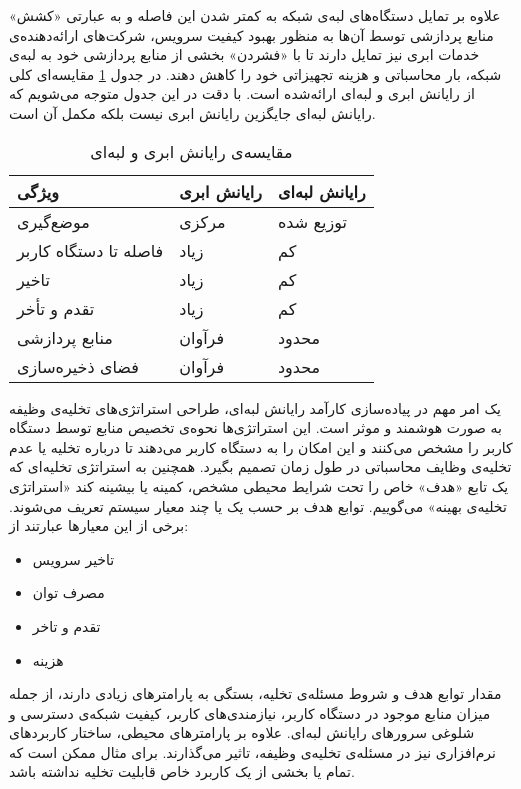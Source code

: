 علاوه بر تمایل دستگاه‌های لبه‌ی شبکه به کمتر شدن این فاصله و به عبارتی «کشش» منابع پردازشی توسط آن‌ها به منظور بهبود کیفیت سرویس، شرکت‌های ارائه‌دهنده‌ی خدمات ابری نیز تمایل دارند تا با «فشردن» بخشی از منابع پردازشی خود به لبه‌ی شبکه، بار محاسباتی و هزینه تجهیزاتی خود را کاهش دهند.\cite{edgevisions} در جدول \ref{table:compare} مقایسه‌ای کلی از رایانش ابری و لبه‌ای ارائه‌شده است. با دقت در این جدول متوجه می‌شویم که رایانش لبه‌ای جایگزین رایانش ابری نیست بلکه مکمل آن است.
\newpage
\begin{table}[H]
	\centering
	\begin{tabular}{@{}lll@{}}
		\toprule
		ویژگی    & رایانش ابری         & رایانش لبه‌ای \\ \midrule
		موضع‌گیری          & مرکزی & توزیع شده    \\
		فاصله تا دستگاه کاربر  & زیاد        & کم            \\
		تاخیر             & زیاد        & کم            \\
		تقدم و تأخر              & زیاد        & کم            \\
		منابع پردازشی & فرآوان       & محدود        \\
		فضای ذخیره‌سازی    & فرآوان       & محدود        \\ \bottomrule
	\end{tabular}
	\caption{مقایسه‌ی رایانش ابری و لبه‌ای}
	\label{table:compare}
\end{table}
یک امر مهم در پیاده‌سازی کارآمد رایانش لبه‌ای، طراحی استراتژی‌های تخلیه‌ی وظیفه به صورت هوشمند و موثر است. این استراتژی‌ها نحوه‌ی تخصیص منابع توسط دستگاه کاربر را مشخص می‌کنند و این امکان را به دستگاه کاربر می‌دهند تا درباره تخلیه یا عدم تخلیه‌ی وظایف محاسباتی در طول زمان تصمیم بگیرد. همچنین به استراتژی تخلیه‌ای که یک تابع «هدف» خاص را تحت شرایط محیطی مشخص، کمینه یا بیشینه کند «استراتژی تخلیه‌ی بهینه» می‌گوییم. توابع هدف بر حسب یک یا چند معیار سیستم تعریف می‌شوند. برخی از این معیارها عبارتند از:
\begin{multicols}{2}
	\begin{itemize}
		\item تاخیر سرویس
		\item مصرف توان 
		\item تقدم و تاخر
		\item هزینه
	\end{itemize}
\end{multicols}
مقدار توابع هدف و شروط مسئله‌ی تخلیه، بستگی به پارامترهای زیادی دارند، از جمله میزان منابع موجود در دستگاه کاربر، نیازمندی‌های کاربر، کیفیت شبکه‌ی دسترسی و شلوغی سرورهای رایانش لبه‌ای. علاوه بر پارامترهای محیطی، ساختار کاربردهای نرم‌افزاری نیز در مسئله‌ی تخلیه‌ی وظیفه، تاثیر می‌گذارند. برای مثال ممکن است که تمام یا بخشی از یک کاربرد خاص قابلیت تخلیه نداشته باشد. \cite{mach} \\


